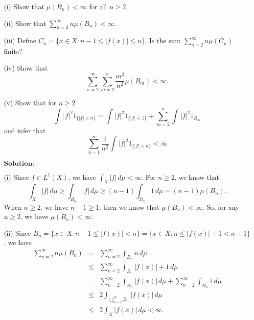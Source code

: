 \documentclass[12pt,a4paper]{ctexart}
\begin{document}
(i) Show that $\mu(B_{n}) < \infty$ for all $n \geq 2$.

(ii) Show that $\sum_{n=2}^{\infty} n \mu(B_{n}) < \infty$.

(iii) Define $C_{n} = \{x \in X : n-1 \leq |f(x)| \leq n \}$. Is the sum $\sum_{n=2}^{\infty} n \mu(C_{n})$ finite?

(iv) Show that $$\sum_{n=2}^{\infty} \sum_{m=2}^{n} \frac{m^{2}}{n^{2}} \mu(B_{m}) < \infty.$$

(v) Show that for $n \geq 2$
\begin{equation*}
    \int_{}^{} |f|^{2} 1_{\{|f| < n\}} = \int_{}^{} |f|^{2} 1_{\{|f| < 1\}} + \sum_{m=2}^{n} \int_{}^{} |f|^{2} 1_{B_{m}}
\end{equation*}
and infer that
\begin{equation*}
    \sum_{n=1}^{\infty} \frac{1}{n^{2}} \int_{}^{} |f|^{2} 1_{\{|f| < n\}} < \infty 
\end{equation*}
 
 
 
\vspace{8pt}
$\textbf{Solution:}$

(i) Since $f \in L^{1}(X)$, we have $\int_{X}^{} |f| \, d \mu < \infty$. For $n \geq 2$, we know that
\begin{equation*}
    \int_{X}^{} |f| \, d \mu \geq \int_{B_{n}}^{} |f| \, d \mu \geq (n-1) \int_{B_{n}}^{} 1 \, d \mu = (n-1) \mu(B_{n}).
\end{equation*}
When $n \geq 2$, we have $n-1 \geq 1$, then we know that $\mu(B_{n}) < \infty$.  So, for any $n \geq 2$, we have $\mu(B_{n}) < \infty$.

(ii) Since $B_{n} = \{ x \in X: n-1 \leq |f(x)| < n \} = \{x \in X: n \leq |f(x)|+1 < n+1 \}$, we have
\begin{eqnarray*}
    \sum_{n=2}^{\infty} n \mu(B_{n}) & = & \sum_{n=2}^{\infty} \int_{B_{n}}^{} n \, d \mu \\
& \leq & \sum_{n=2}^{\infty}  \int_{B_{n}}^{} |f(x)| + 1 \, d \mu \\
& = & \sum_{n=2}^{\infty}  \int_{B_{n}}^{} |f(x)| \, d \mu + \sum_{n=2}^{\infty}  \int_{B_{n}}^{} 1 \, d \mu \\ 
& \leq & 2 \int_{\bigcup_{n=2}^{\infty} B_{n}}^{} |f(x)| \, d \mu \\
& \leq & 2 \int_{X}^{} |f(x)| \, d \mu < \infty.
\end{eqnarray*}
\end{document}
